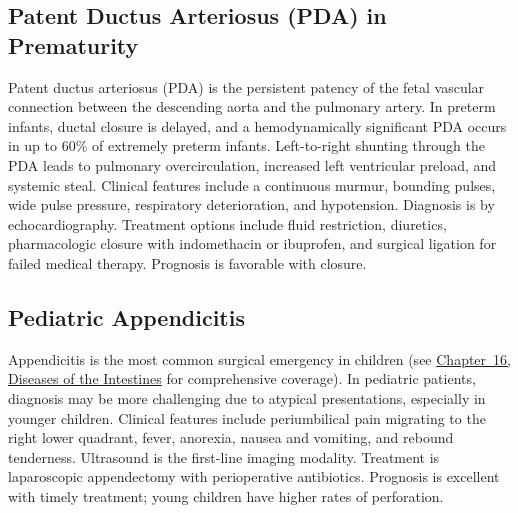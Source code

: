 \subsection{Patent Ductus Arteriosus (PDA) in Prematurity}
\label{sec:Patent Ductus Arteriosus in Prematurity}
Patent ductus arteriosus (PDA) is the persistent patency of the fetal vascular connection between the descending aorta and the pulmonary artery. In preterm infants, ductal closure is delayed, and a hemodynamically significant PDA occurs in up to 60\% of extremely preterm infants. Left-to-right shunting through the PDA leads to pulmonary overcirculation, increased left ventricular preload, and systemic steal. Clinical features include a continuous murmur, bounding pulses, wide pulse pressure, respiratory deterioration, and hypotension. Diagnosis is by echocardiography. Treatment options include fluid restriction, diuretics, pharmacologic closure with indomethacin or ibuprofen, and surgical ligation for failed medical therapy. Prognosis is favorable with closure.

\subsection{Pediatric Appendicitis}
\label{sec:Pediatric Appendicitis}
Appendicitis is the most common surgical emergency in children (see \hyperref[ch:intestines]{Chapter~16, Diseases of the Intestines} for comprehensive coverage). In pediatric patients, diagnosis may be more challenging due to atypical presentations, especially in younger children. Clinical features include periumbilical pain migrating to the right lower quadrant, fever, anorexia, nausea and vomiting, and rebound tenderness. Ultrasound is the first-line imaging modality. Treatment is laparoscopic appendectomy with perioperative antibiotics. Prognosis is excellent with timely treatment; young children have higher rates of perforation.

